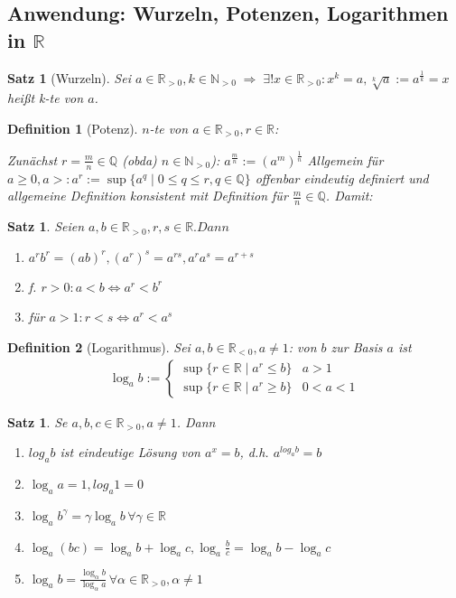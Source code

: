 \documentclass[ngerman,a4paper]{report}
\theoremstyle{break}
\newtheorem{satz}[theorem]{Satz}
\newtheorem*{definition}{Definition}
\newcommand{\highlight}[1]{\emph{#1}}
\begin{document}
\subsection*{Anwendung: Wurzeln, Potenzen, Logarithmen in $\mathbb{R}$}
\begin{satz}[Wurzeln]
	Sei $a\in\mathbb{R}_{>0}, k\in\mathbb{N}_{>0} \;\Rightarrow \; \exists ! x\in \mathbb{R}_{>0}: x^k = a, \sqrt[k]{a}:=a^{\frac{1}{k}} = x$ heißt \highlight{k-te}  von $a$.
\end{satz}
\begin{definition}[Potenz]
	$n$-te  von $a\in\mathbb{R}_{>0}, r\in\mathbb{R}$:
	
	Zunächst $r=\frac{m}{n}\in\mathbb{Q}$ (\gls{obda}) $n\in\mathbb{N}_{>0}$): $ a^{\frac{m}{n}}:= (a^m)^{\frac{1}{n}}$
	Allgemein für $a\ge 0, a > : a^r := \sup \{ a^q \mid 0 \le q \le r,q\in\mathbb{Q} \}$
	offenbar eindeutig definiert und allgemeine Definition konsistent mit Definition für $\frac{m}{n}\in\mathbb{Q}$.
	Damit: 
\end{definition}
\begin{satz}\label{satz_potenz_r}
	Seien $a,b\in\mathbb{R}_{>0}, r,s\in\mathbb{R}. Dann$
	\begin{enumerate}[label={\arabic*)}]
		\item $a^r b^r = (ab)^r, (a^r)^s = a^{rs}, a^ra^s = a^{r+s}$
		\item f. $r > 0: a < b \Leftrightarrow a^r < b^r$
		\item für $a > 1: r < s \Leftrightarrow a^r < a^s$
	\end{enumerate}
\end{satz}

\begin{definition}[Logarithmus]
	Sei $a,b\in\mathbb{R}_{<0}, a\neq 1$: \highlight{von $b$ zur Basis $a$} ist \begin{align*}
	 \log_a b :=\begin{cases}
	 \sup \{ r \in \mathbb{R} \mid a^r \le b\}& a > 1\\
 	\sup \{r\in\mathbb{R}\mid a^r \ge b\}& 0 < a < 1
	 \end{cases}
	\end{align*}
\end{definition}
\begin{satz}\label{satz_logarithmus_r}
	Se $a,b,c\in\mathbb{R}_{>0}, a\neq 1$. Dann
	\begin{enumerate}[label={\arabic*)}]
		\item $log_a b$ ist eindeutige Lösung von $a^x = b$, d.h. $a^{log_a b} = b$
		\item $\log_a a = 1, log_a 1 = 0$
		\item $\log_a b^\gamma = \gamma \log_a b \,\forall \gamma\in\mathbb{R}$
		\item $\log_a(bc) = \log_a b + \log_a c, \log_a \frac{b}{c} = \log_a b - \log_a c$
		\item $\log_a b = \frac{\log_\alpha b}{\log_\alpha a}\,\forall \alpha\in\mathbb{R}_{>0},\alpha\neq 1$
	\end{enumerate}
\end{satz}
\end{document}
